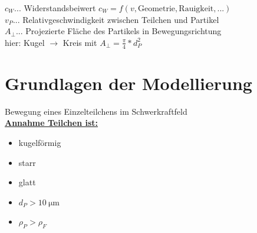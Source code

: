 $c_W$... Widerstandsbeiwert $c_W=f(v,\text{Geometrie}, \text{Rauigkeit},...)$\\
$v_P$... Relativgeschwindigkeit zwischen Teilchen und Partikel\\
$A_\perp$... Projezierte Fläche des Partikels in Bewegungsrichtung\\
hier: Kugel $\rightarrow$ Kreis mit $A_\perp=\frac{\pi}{4}*d_P^2$

\newpage

\section{Grundlagen der Modellierung}
Bewegung eines Einzelteilchens im Schwerkraftfeld\\

\textbf{\underline{Annahme Teilchen ist:}} 
\begin{itemize}
	\item kugelförmig
	\item starr
	\item glatt
	\item $d_P>\SI{10}{\micro \meter}$
	\item $\rho_P>\rho_F$
\end{itemize}

